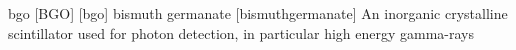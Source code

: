 \newglsXchemical%
{bgo}%
[BGO]%
[bgo]%
{bismuth germanate}%
{}%
[bismuthgermanate]%
{An inorganic crystalline scintillator used for photon detection, in particular high energy \glspl{gamma-ray}}%